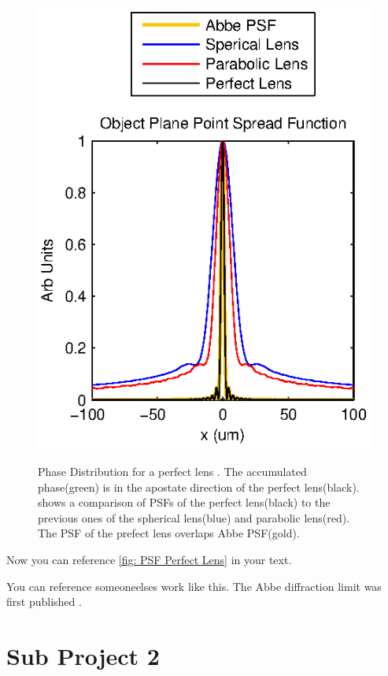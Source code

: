 \documentclass[10pt,hyperref,normalmargins]{ucdthesis}
\begin{document}
\begin{figure}[h]
\begin{centering}
{    \includegraphics[]{Graphics/Point_Spread_Function/psf_perfect_lens.eps}
    \label{fig: PSF Perfect Lens}}
    \caption[]{Phase Distribution for a perfect lens . The accumulated phase(green) is in the apostate direction of the perfect lens(black).   shows a comparison of PSFs of the perfect lens(black) to the previous ones of the spherical lens(blue) and parabolic lens(red). The PSF of the prefect lens overlaps Abbe PSF(gold).
    \label{fig: Perfect Lens}}
    \end{centering}
\end{figure}

Now you can reference \ref{fig: PSF Perfect Lens} in your text. 

You can reference someoneelses work like this. The Abbe diffraction limit was first published \cite{abbe_relation_1882} . 

\chapter{Sub Project 2}
\end{document}

